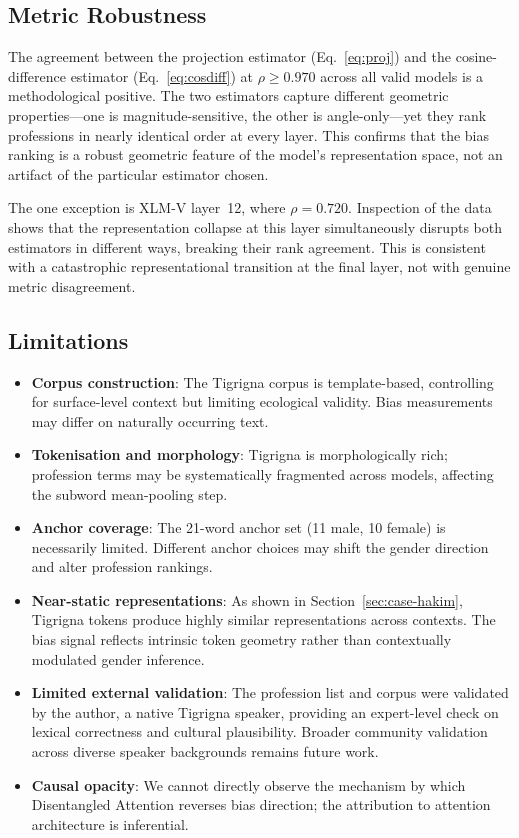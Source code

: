 \documentclass[10pt]{article}
\begin{document}
\subsection{Metric Robustness}

The agreement between the projection estimator (Eq.~\ref{eq:proj}) and the
cosine-difference estimator (Eq.~\ref{eq:cosdiff}) at $\rho \geq 0.970$
across all valid models is a methodological positive. The two estimators
capture different geometric properties---one is magnitude-sensitive, the
other is angle-only---yet they rank professions in nearly identical order
at every layer. This confirms that the bias ranking is a robust geometric
feature of the model's representation space, not an artifact of the
particular estimator chosen.

The one exception is XLM-V layer~12, where $\rho = 0.720$. Inspection
of the data shows that the representation collapse at this layer
simultaneously disrupts both estimators in different ways, breaking their
rank agreement. This is consistent with a catastrophic representational
transition at the final layer, not with genuine metric disagreement.

\subsection{Limitations}

\begin{itemize}[noitemsep,leftmargin=*]
  \item \textbf{Corpus construction}: The Tigrigna corpus is template-based,
        controlling for surface-level context but limiting ecological validity.
        Bias measurements may differ on naturally occurring text.
  \item \textbf{Tokenisation and morphology}: Tigrigna is morphologically rich;
        profession terms may be systematically fragmented across models,
        affecting the subword mean-pooling step.
  \item \textbf{Anchor coverage}: The 21-word anchor set (11 male, 10 female)
        is necessarily limited. Different anchor choices may shift the
        gender direction and alter profession rankings.
  \item \textbf{Near-static representations}: As shown in
        Section~\ref{sec:case-hakim}, Tigrigna tokens produce highly similar
        representations across contexts. The bias signal reflects intrinsic
        token geometry rather than contextually modulated gender inference.
  \item \textbf{Limited external validation}: The profession list and
        corpus were validated by the author, a native Tigrigna speaker,
        providing an expert-level check on lexical correctness and
        cultural plausibility. Broader community validation across diverse
        speaker backgrounds remains future work.
  \item \textbf{Causal opacity}: We cannot directly observe the mechanism by
        which Disentangled Attention reverses bias direction; the attribution
        to attention architecture is inferential.
\end{itemize}
\end{document}
